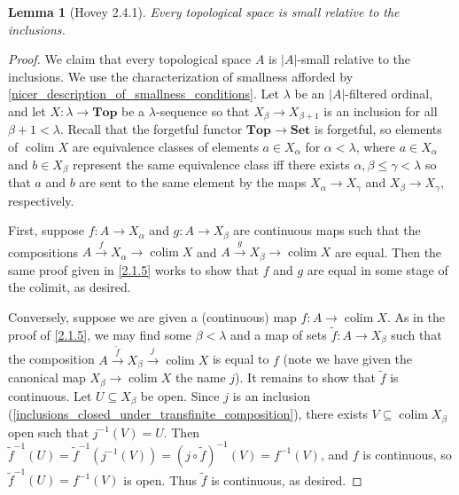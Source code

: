 \documentclass{amsart}
\theoremstyle{plain}
\newtheorem{lemma}[theorem]{Lemma}
\theoremstyle{definition}
\newcommand{\Top}{\mbf{Top}}
\newcommand{\Set}{\mbf{Set}}
\newcommand{\sseq}{\subseteq}
\newcommand{\wt}{\widetilde}
\newcommand{\0}{\mathbf{0}}
\newcommand{\mbf}[1]{\mathbf{#1}}
\renewcommand{\(}{\left(}
\renewcommand{\)}{\right)}
\DeclareMathOperator*{\colim}{colim}
\begin{document}
\begin{lemma}[Hovey 2.4.1]\label{2.4.1}
  Every topological space is small relative to the inclusions.
\end{lemma}
\begin{proof}
  We claim that every topological space $A$ is $|A|$-small relative to the inclusions. We use the characterization of smallness afforded by \autoref{nicer_description_of_smallness_conditions}. Let $\lambda$ be an $|A|$-filtered ordinal, and let $X:\lambda\to\Top$ be a $\lambda$-sequence so that $X_\beta\to X_{\beta+1}$ is an inclusion for all $\beta+1<\lambda$. Recall that the forgetful functor $\Top\to\Set$ is forgetful, so elements of $\colim X$ are equivalence classes of elements $a\in X_\alpha$ for $\alpha<\lambda$, where $a\in X_\alpha$ and $b\in X_\beta$ represent the same equivalence class iff there exists $\alpha,\beta\leq\gamma<\lambda$ so that $a$ and $b$ are sent to the same element by the maps $X_\alpha\to X_\gamma$ and $X_\beta\to X_\gamma$, respectively.

  First, suppose $f:A\to X_\alpha$ and $g:A\to X_\beta$ are continuous maps such that the compositions $A\xrightarrow fX_\alpha\to\colim X$ and $A\xrightarrow gX_\beta\to \colim X$ are equal. Then the same proof given in \autoref{2.1.5} works to show that $f$ and $g$ are equal in some stage of the colimit, as desired.

  Conversely, suppose we are given a (continuous) map $f:A\to\colim X$. As in the proof of \autoref{2.1.5}, we may find some $\beta<\lambda$ and a map of sets $\wt f:A\to X_\beta$ such that the composition $A\xrightarrow{\wt f}X_\beta\xrightarrow j\colim X$ is equal to $f$ (note we have given the canonical map $X_\beta\to\colim X$ the name $j$). It remains to show that $\wt f$ is continuous. Let $U\sseq X_\beta$ be open. Since $j$ is an inclusion (\autoref{inclusions_closed_under_transfinite_composition}), there exists $V\sseq\colim X_\beta$ open such that $j^{-1}(V)=U$. Then ${\wt f}^{-1}(U)=\wt f^{-1}(j^{-1}(V))=(j\circ\wt f)^{-1}(V)=f^{-1}(V)$, and $f$ is continuous, so $\wt f^{-1}(U)=f^{-1}(V)$ is open. Thus $\wt f$ is continuous, as desired.
\end{proof}
\end{document}
